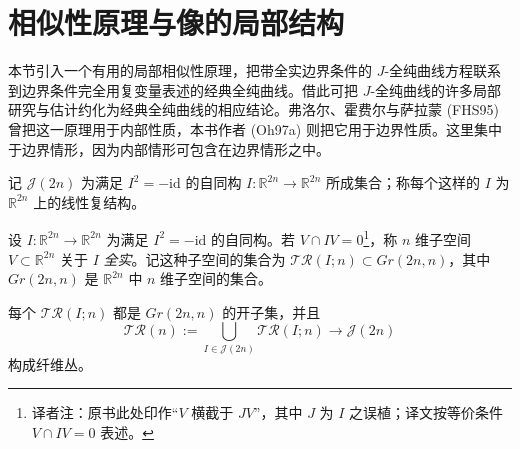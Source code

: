 \section{相似性原理与像的局部结构}
\label{sec:similarity-principle-local-image}
本节引入一个有用的局部相似性原理，把带全实边界条件的 $J$-全纯曲线方程联系到边界条件完全用复变量表述的经典全纯曲线。借此可把 $J$-全纯曲线的许多局部研究与估计约化为经典全纯曲线的相应结论。弗洛尔、霍费尔与萨拉蒙 (FHS95) 曾把这一原理用于内部性质，本书作者 (Oh97a) 则把它用于边界性质。这里集中于边界情形，因为内部情形可包含在边界情形之中。

记 $\mathcal J(2n)$ 为满足 $I^2=-\mathrm{id}$ 的自同构
$I:\mathbb R^{2n}\to\mathbb R^{2n}$ 所成集合；称每个这样的 $I$ 为
$\mathbb R^{2n}$ 上的线性复结构。
\begin{definition}\label{def:ch8-linear-totally-real}
设 $I:\mathbb R^{2n}\to\mathbb R^{2n}$ 为满足 $I^2=-\mathrm{id}$ 的自同构。若
$V\cap IV=0$\footnote{译者注：原书此处印作“$V$ 横截于 $JV$”，其中 $J$ 为 $I$ 之误植；译文按等价条件 $V\cap IV=0$ 表述。}，称 $n$ 维子空间 $V\subset\mathbb R^{2n}$ 关于 $I$ \emph{全实}。记这种子空间的集合为
$\mathcal{TR}(I;n)\subset Gr(2n,n)$，其中 $Gr(2n,n)$ 是
$\mathbb R^{2n}$ 中 $n$ 维子空间的集合。
\end{definition}
每个 $\mathcal{TR}(I;n)$ 都是 $Gr(2n,n)$ 的开子集，并且
\[
 \mathcal{TR}(n):=\bigcup_{I\in\mathcal J(2n)}\mathcal{TR}(I;n)
 \longrightarrow\mathcal J(2n)
\]
构成纤维丛。

